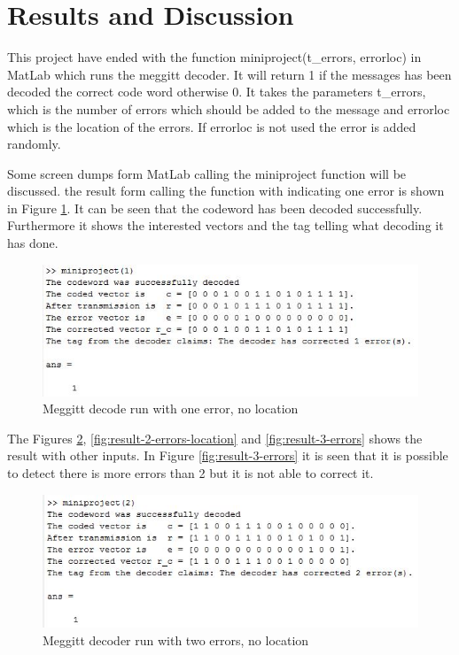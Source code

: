 \documentclass[Main]{subfiles}
\begin{document}
\section{Results and Discussion}
This project have ended with the function miniproject(t\_errors, errorloc) in MatLab which runs the meggitt decoder.
It will return 1 if the messages has been decoded the correct code word otherwise 0.
It takes the parameters t\_errors, which is the number of errors which should be added to the message and errorloc which is the location of the errors.
If errorloc is not used the error is added randomly.

Some screen dumps form MatLab calling the miniproject function will be discussed.
the result form calling the function with indicating one error is shown in Figure \ref{fig:result-1-errors}.
It can be seen that the codeword has been decoded successfully.
Furthermore it shows the interested vectors and the tag telling what decoding it has done. 

\begin{figure}[h!]
\centering
\includegraphics[width=0.7\linewidth]{./Picture/result-1-errors}
\caption{Meggitt decode run with one error, no location}
\label{fig:result-1-errors}
\end{figure}

The Figures \ref{fig:result-2-errors}, \ref{fig:result-2-errors-location} and \ref{fig:result-3-errors} shows the result with other inputs.
In Figure \ref{fig:result-3-errors} it is seen that it is possible to detect there is more errors than 2 but it is not able to correct it. 

\begin{figure}[h!]
\centering
\includegraphics[width=0.7\linewidth]{./Picture/result-2-errors}
\caption{Meggitt decoder run with two errors, no location}
\label{fig:result-2-errors}
\end{figure}
\end{document}
